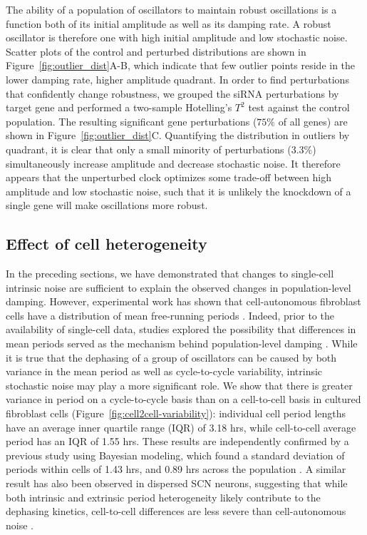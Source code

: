 \documentclass[11pt, letterpaper]{article}
\begin{document}
The ability of a population of oscillators to maintain robust oscillations is a function both of its initial amplitude as well as its damping rate.
A robust oscillator is therefore one with high initial amplitude and low stochastic noise.
Scatter plots of the control and perturbed distributions are shown in Figure~\ref{fig:outlier_dist}A-B, which indicate that few outlier points reside in the lower damping rate, higher amplitude quadrant.
In order to find perturbations that confidently change robustness, we grouped the siRNA perturbations by target gene and performed a two-sample Hotelling's $T^2$ test against the control population.
The resulting significant gene perturbations ($75\%$ of all genes) are shown in Figure~\ref{fig:outlier_dist}C.
Quantifying the distribution in outliers by quadrant, it is clear that only a small minority of perturbations ($3.3\%$) simultaneously increase amplitude and decrease stochastic noise.
It therefore appears that the unperturbed clock optimizes some trade-off between high amplitude and low stochastic noise, such that it is unlikely the knockdown of a single gene will make oscillations more robust. 

\subsection*{Effect of cell heterogeneity}

In the preceding sections, we have demonstrated that changes to single-cell intrinsic noise are sufficient to explain the observed changes in population-level damping.
However, experimental work has shown that cell-autonomous fibroblast cells have a distribution of mean free-running periods \cite{Leise2012}.
Indeed, prior to the availability of single-cell data, studies explored the possibility that differences in mean periods served as the mechanism behind population-level damping \cite{Izumo2003}.
While it is true that the dephasing of a group of oscillators can be caused by both variance in the mean period as well as cycle-to-cycle variability, intrinsic stochastic noise may play a more significant role. 
We show that there is greater variance in period on a cycle-to-cycle basis than on a cell-to-cell basis in cultured fibroblast cells (Figure~\ref{fig:cell2cell-variability}): individual cell period lengths have an average inner quartile range (IQR) of 3.18 hrs, while cell-to-cell average period has an IQR of 1.55 hrs. 
These results are independently confirmed by a previous study using Bayesian modeling, which found a standard deviation of periods within cells of 1.43 hrs, and 0.89 hrs across the population \cite{Cohen2012}.
A similar result has also been observed in dispersed SCN neurons, suggesting that while both intrinsic and extrinsic period heterogeneity likely contribute to the dephasing kinetics, cell-to-cell differences are less severe than cell-autonomous noise \cite{Herzog2004}.
\end{document}
